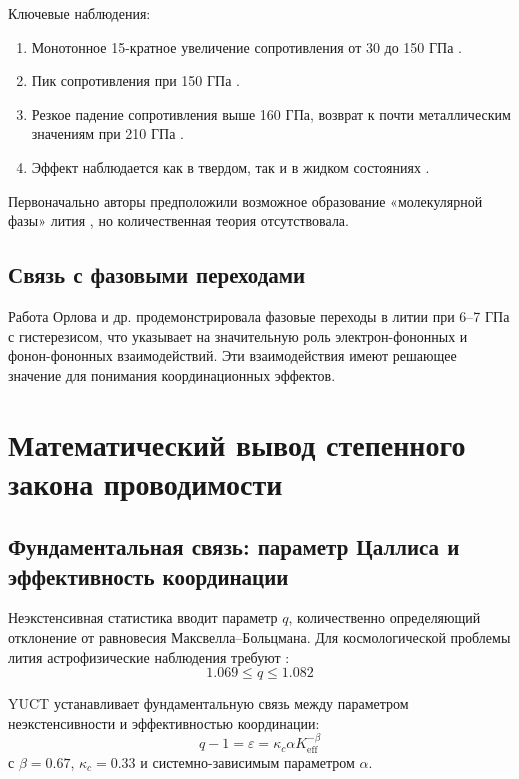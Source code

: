 \documentclass[12pt,a4paper]{article}
\theoremstyle{remark}
\newcommand{\Ke}{K_{\mathrm{eff}}}
\newcommand{\kappac}{\kappa_c}
\newcommand{\alp}{\alpha}
\begin{document}
	Ключевые наблюдения:
	\begin{enumerate}
		\item Монотонное 15-кратное увеличение сопротивления от 30 до 150 ГПа \cite{fortov2001}.
		\item Пик сопротивления при 150 ГПа \cite{yakushev2002}.
		\item Резкое падение сопротивления выше 160 ГПа, возврат к почти металлическим значениям при 210 ГПа \cite{yakushev2002}.
		\item Эффект наблюдается как в твердом, так и в жидком состояниях \cite{fortov2001}.
	\end{enumerate}
	
	Первоначально авторы предположили возможное образование «молекулярной фазы» лития \cite{fortov1999}, но количественная теория отсутствовала.
	
	\subsection{Связь с фазовыми переходами}
	
	Работа Орлова и др. \cite{orlov2001} продемонстрировала фазовые переходы в литии при 6–7 ГПа с гистерезисом, что указывает на значительную роль электрон-фононных и фонон-фононных взаимодействий. Эти взаимодействия имеют решающее значение для понимания координационных эффектов.
	
	\section{Математический вывод степенного закона проводимости}
	
	\subsection{Фундаментальная связь: параметр Цаллиса и эффективность координации}
	
	Неэкстенсивная статистика \cite{tsallis1988} вводит параметр \(q\), количественно определяющий отклонение от равновесия Максвелла–Больцмана. Для космологической проблемы лития астрофизические наблюдения требуют \cite{bertulani2015}:
	\begin{equation}
		1.069 \le q \le 1.082
		\label{eq:q_range}
	\end{equation}
	
	YUCT устанавливает фундаментальную связь между параметром неэкстенсивности и эффективностью координации:
	\begin{equation}
		q - 1 = \varepsilon = \kappac \alp \Ke^{-\beta}
		\label{eq:q_keff}
	\end{equation}
	с \(\beta = 0.67\), \(\kappac = 0.33\) и системно-зависимым параметром \(\alp\).
	
\end{document}
